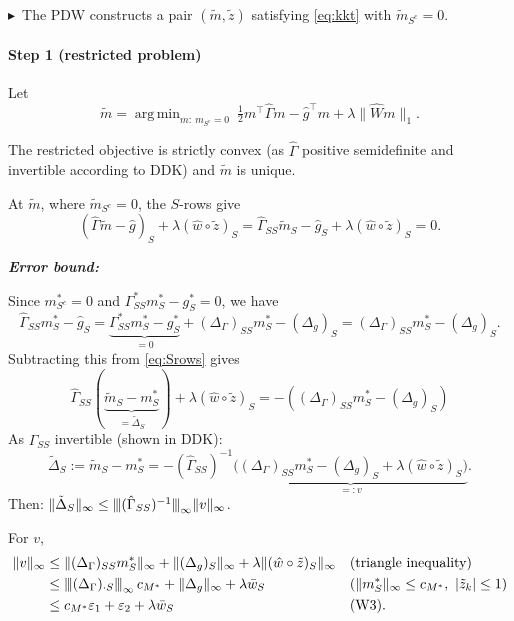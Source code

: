 \documentclass[11pt,a4paper]{article}
\numberwithin{equation}{section}
\theoremstyle{plain}
\theoremstyle{remark}
\newcommand{\opnorm}[1]{{\vert\kern-0.25ex\vert\kern-0.25ex\vert #1 \vert\kern-0.25ex\vert\kern-0.25ex\vert}}
\DeclareMathOperator*{\argmin}{arg\,min}
\newcommand{\changed}{$\blacktriangleright$\ }
\begin{document}
\changed The PDW constructs a pair $(\tilde m,\tilde z)$ satisfying \eqref{eq:kkt} with $\tilde m_{S^c}=0$.

\paragraph{Step 1 (restricted problem)} Let
\begin{equation}\label{eq:restricted}
\tilde m=\argmin_{m:\ m_{S^c}=0}\ \tfrac12m^\top\hat\Gamma m-\hat g^\top m+\lambda\|\hat Wm\|_1 .
\end{equation}

The restricted objective is strictly convex (as $\hat\Gamma$ positive semidefinite and invertible according to DDK) and $\tilde m$ is unique.


At $\tilde m$, where $\tilde m_{S^c}=0$, the $S$-rows give
\begin{equation}\label{eq:Srows}
(\hat\Gamma \tilde m - \hat g)_S + \lambda(\hat w\circ\tilde z)_S
  = \hat\Gamma_{SS}\tilde m_S - \hat g_S + \lambda(\hat w\circ\tilde z)_S = 0.
\end{equation}

\emph{\textbf{Error bound:}} 

Since $m^*_{S^c}=0$ and $\Gamma^*_{SS}m^*_S-g^*_S = 0$, we have
\begin{equation*}
\hat\Gamma_{SS}m^*_S-\hat g_S= \underbrace{\Gamma_{SS}^*m^*_S - g^*_S}_{=0} + (\Delta_\Gamma)_{SS}m^*_S-(\Delta_g)_S = (\Delta_\Gamma)_{SS}m^*_S-(\Delta_g)_S .
\end{equation*}
Subtracting this from \eqref{eq:Srows} gives
\begin{equation*}
\hat\Gamma_{SS}(\underbrace{\tilde{m}_S-m^*_S}_{=\tilde\Delta_S}) + \lambda(\hat w\circ\tilde z)_S = -((\Delta_\Gamma)_{SS}m^*_S - (\Delta_g)_S)
\end{equation*}
As $\hat\Gamma_{SS}$ invertible (shown in DDK):
\[
\tilde\Delta_S:=\tilde m_S-m^*_S=-(\hat\Gamma_{SS})^{-1}\underbrace{\Big((\Delta_\Gamma)_{SS}m^*_S-(\Delta_g)_S+\lambda(\hat w\circ\tilde z)_S\Big)}_{=:v}.
\]
Then: $\|\tilde\Delta_S\|_\infty\le\opnorm{(\hat\Gamma_{SS})^{-1}}_\infty\|v\|_\infty$. 

For $v$,
\begin{align*}
\|v\|_\infty
&\le\|(\Delta_\Gamma)_{SS}m^*_S\|_\infty+\|(\Delta_g)_S\|_\infty+\lambda\|(\hat w\circ\tilde z)_S\|_\infty && \text{(triangle inequality)}\\
&\le\opnorm{(\Delta_\Gamma)_{\cdot S}}_\infty\,c_{M^*}+\|\Delta_g\|_\infty+\lambda\bar w_S && (\|m^*_S\|_\infty\le c_{M^*},\ |\tilde z_k|\le1)\\
&\le c_{M^*}\varepsilon_1+\varepsilon_2+\lambda\bar w_S && \text{(W3)}.
\end{align*}
\end{document}
